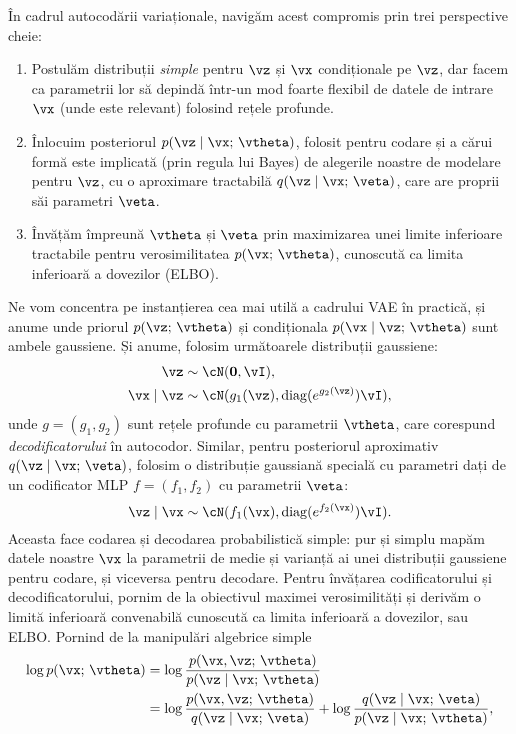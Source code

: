 \documentclass[../../book-main_ro.tex]{subfiles}
\begin{document}
În cadrul autocodării variaționale, navigăm acest compromis prin
trei perspective cheie:
\begin{enumerate}
\item Postulăm distribuții \textit{simple} pentru $\vz$ și $\vx$ condiționale
  pe $\vz$, dar facem ca parametrii lor să depindă într-un mod foarte flexibil de
  datele de intrare $\vx$ (unde este relevant) folosind rețele profunde.
\item Înlocuim posteriorul $p(\vz \mid \vx;\, \vtheta)$, folosit pentru codare
  și a cărui formă este implicată (prin regula lui Bayes) de alegerile noastre de modelare pentru $\vz$,
  cu o aproximare tractabilă $q(\vz \mid \vx;\, \veta)$, care are proprii săi
  parametri $\veta$.
\item Învățăm împreună $\vtheta$ și $\veta$ prin maximizarea unei limite inferioare tractabile
  pentru verosimilitatea $p(\vx ;\, \vtheta)$, cunoscută ca limita inferioară a dovezilor (ELBO).
\end{enumerate}
Ne vom concentra pe instanțierea cea mai utilă a cadrului VAE
în practică, și anume
unde priorul $p(\vz ;\, \vtheta)$ și condiționala $p(\vx \mid \vz;\,
\vtheta)$ sunt ambele gaussiene. Și anume, folosim următoarele distribuții
gaussiene:
\begin{align*}
\vz &\sim \cN(\Zero, \vI), \\
\vx \mid \vz &\sim \cN(g_1(\vz), \diag(e^{g_2(\vz)}) \vI),
\end{align*}
unde $g = (g_1, g_2)$ sunt rețele profunde cu parametrii $\vtheta$, care
corespund \textit{decodificatorului} în autocodor.
Similar, pentru posteriorul aproximativ $q(\vz \mid \vx;\, \veta)$, folosim
o distribuție gaussiană specială cu parametri dați de un codificator
MLP $f = (f_1, f_2)$ cu parametrii $\veta$:
\begin{equation*}
\vz \mid \vx \sim \cN(f_1(\vx), \diag(e^{f_2(\vx)}) \vI).
\end{equation*}
Aceasta face codarea și decodarea probabilistică simple: pur și simplu mapăm datele noastre
$\vx$ la parametrii de medie și varianță ai unei distribuții gaussiene pentru
codare, și viceversa pentru decodare.
Pentru învățarea codificatorului și decodificatorului, pornim de la obiectivul
maximei verosimilități  și derivăm o limită inferioară convenabilă cunoscută ca
limita inferioară a dovezilor, sau ELBO. Pornind de la manipulări algebrice simple
\begin{align*}
\log p(\vx;\, \vtheta) &=
\log \frac{p(\vx, \vz;\, \vtheta)}{p(\vz \mid \vx;\, \vtheta)}
\\
&=
\log \frac{p(\vx, \vz;\, \vtheta)}{q(\vz \mid \vx;\, \veta)}
+
\log \frac{q(\vz \mid \vx;\, \veta)}{p(\vz \mid \vx;\, \vtheta)},
\end{align*}
\end{document}
